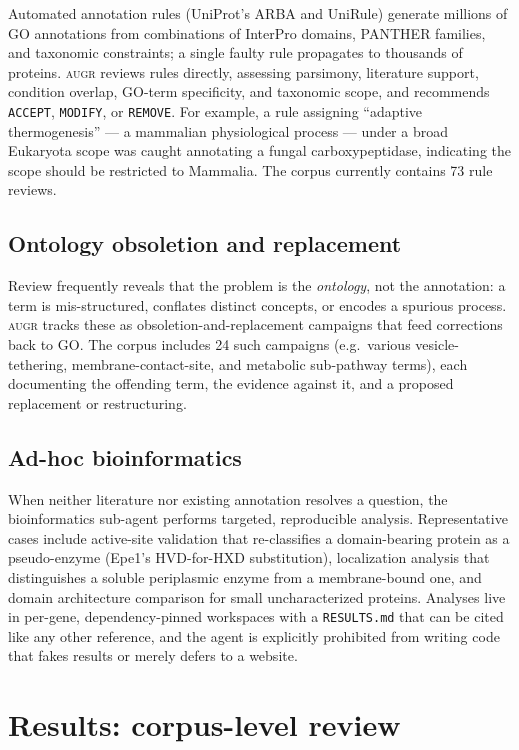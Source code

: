\documentclass[11pt]{article}
\newcommand{\augr}{\textsc{augr}}
\newcommand{\code}[1]{\texttt{#1}}
\begin{document}
Automated annotation rules (UniProt's ARBA and UniRule) generate millions of GO
annotations from combinations of InterPro domains, PANTHER families, and taxonomic
constraints; a single faulty rule propagates to thousands of proteins. \augr{}
reviews rules directly, assessing parsimony, literature support, condition
overlap, GO-term specificity, and taxonomic scope, and recommends \code{ACCEPT},
\code{MODIFY}, or \code{REMOVE}. For example, a rule assigning ``adaptive
thermogenesis'' --- a mammalian physiological process --- under a broad Eukaryota
scope was caught annotating a fungal carboxypeptidase, indicating the scope should
be restricted to Mammalia. The corpus currently contains 73 rule reviews.

\subsection{Ontology obsoletion and replacement}

Review frequently reveals that the problem is the \emph{ontology}, not the
annotation: a term is mis-structured, conflates distinct concepts, or encodes a
spurious process. \augr{} tracks these as obsoletion-and-replacement campaigns
that feed corrections back to GO. The corpus includes 24 such campaigns (e.g.\
various vesicle-tethering, membrane-contact-site, and metabolic sub-pathway terms),
each documenting the offending term, the evidence against it, and a proposed
replacement or restructuring.

\subsection{Ad-hoc bioinformatics}

When neither literature nor existing annotation resolves a question, the
bioinformatics sub-agent performs targeted, reproducible analysis. Representative
cases include active-site validation that re-classifies a domain-bearing protein as
a pseudo-enzyme (Epe1's HVD-for-HXD substitution), localization analysis that
distinguishes a soluble periplasmic enzyme from a membrane-bound one, and domain
architecture comparison for small uncharacterized proteins. Analyses live in
per-gene, dependency-pinned workspaces with a \code{RESULTS.md} that can be cited
like any other reference, and the agent is explicitly prohibited from writing code
that fakes results or merely defers to a website.

\section{Results: corpus-level review}
\label{sec:results}
\end{document}
